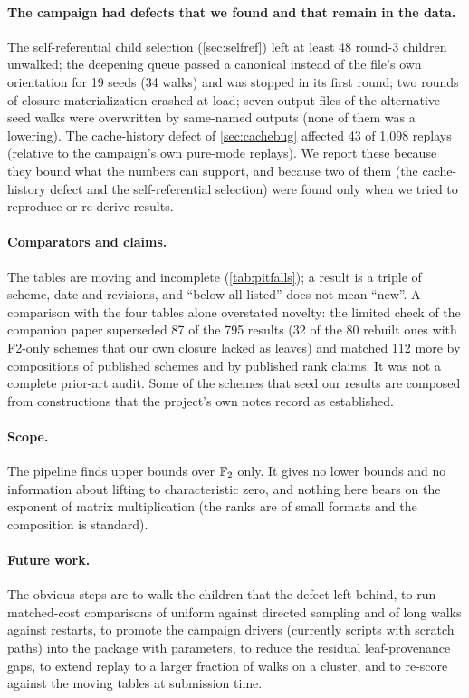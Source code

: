 \paragraph{The campaign had defects that we found and that remain in the data.}
The self-referential child selection (\cref{sec:selfref}) left at least 48 round-3 children unwalked; the deepening queue passed a canonical instead of the file's own orientation for 19 seeds (34 walks) and was stopped in its first round; two rounds of closure materialization crashed at load; seven output files of the alternative-seed walks were overwritten by same-named outputs (none of them was a lowering). The cache-history defect of \cref{sec:cachebug} affected 43 of 1{,}098 replays (relative to the campaign's own pure-mode replays). We report these because they bound what the numbers can support, and because two of them (the cache-history defect and the self-referential selection) were found only when we tried to reproduce or re-derive results.

\paragraph{Comparators and claims.}
The tables are moving and incomplete (\cref{tab:pitfalls}); a result is a triple of scheme, date and revisions, and ``below all listed'' does not mean ``new''. A comparison with the four tables alone overstated novelty: the limited check of the companion paper superseded 87 of the 795 results (32 of the 80 rebuilt ones with F2-only schemes that our own closure lacked as leaves) and matched 112 more by compositions of published schemes and by published rank claims. It was not a complete prior-art audit. Some of the schemes that seed our results are composed from constructions that the project's own notes record as established.

\paragraph{Scope.}
The pipeline finds upper bounds over ${\mathbb{F}_2}$ only. It gives no lower bounds and no information about lifting to characteristic zero, and nothing here bears on the exponent of matrix multiplication (the ranks are of small formats and the composition is standard).

\paragraph{Future work.}
The obvious steps are to walk the children that the defect left behind, to run matched-cost comparisons of uniform against directed sampling and of long walks against restarts, to promote the campaign drivers (currently scripts with scratch paths) into the package with parameters, to reduce the residual leaf-provenance gaps, to extend replay to a larger fraction of walks on a cluster, and to re-score against the moving tables at submission time.

